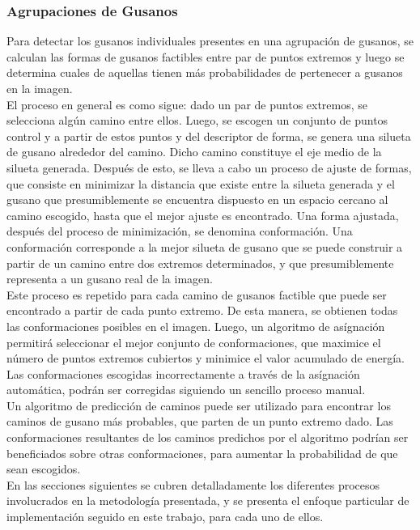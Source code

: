 \subsubsection*{Agrupaciones de Gusanos}
Para detectar los gusanos individuales presentes en una agrupaci\'on de gusanos, 
se calculan las formas de gusanos factibles entre par de puntos extremos y luego 
se determina cuales de aquellas tienen m\'as probabilidades de pertenecer a gusanos 
en la imagen. \\

El proceso en general es como sigue: dado un par de puntos extremos, se selecciona
alg\'un camino entre ellos. Luego, se escogen un conjunto de puntos control y
a partir de estos puntos y del descriptor de forma, 
se genera una silueta de gusano alrededor del camino. Dicho camino constituye el 
eje medio de la silueta generada. Despu\'es de esto, se lleva a cabo un proceso de 
ajuste de formas, que consiste en minimizar la distancia que existe entre la silueta
generada y el gusano que presumiblemente se encuentra dispuesto en un espacio 
cercano al camino escogido, hasta que el mejor ajuste es encontrado. Una forma ajustada,
despu\'es del proceso de minimizaci\'on, se denomina conformaci\'on. Una conformaci\'on 
corresponde a la mejor silueta de gusano que se puede construir a partir de un camino
entre dos extremos determinados, y que presumiblemente representa a un gusano real
de la imagen. \\

Este proceso es repetido para cada camino de gusanos factible que puede ser encontrado
a partir de cada punto extremo. De esta manera, se obtienen todas las conformaciones
posibles en el imagen. Luego, un algoritmo de as\'ignaci\'on permitir\'a seleccionar
el mejor conjunto de conformaciones, que maximice el n\'umero de puntos extremos cubiertos
y minimice el valor acumulado de energ\'ia. Las conformaciones escogidas incorrectamente
a trav\'es de la as\'ignaci\'on autom\'atica, podr\'an ser corregidas siguiendo
un sencillo proceso manual.\\

Un algoritmo de predicci\'on de caminos puede ser utilizado para encontrar
los caminos de gusano m\'as probables, que parten de un punto extremo dado.
Las conformaciones resultantes de los caminos predichos por el algoritmo podr\'ian
ser beneficiados sobre otras conformaciones, para aumentar la probabilidad de que
sean escogidos.\\

En las secciones siguientes se cubren detalladamente los diferentes procesos
involucrados en la metodolog\'ia presentada, y se presenta el enfoque particular
de implementaci\'on seguido en este trabajo, para cada uno de ellos.
  


